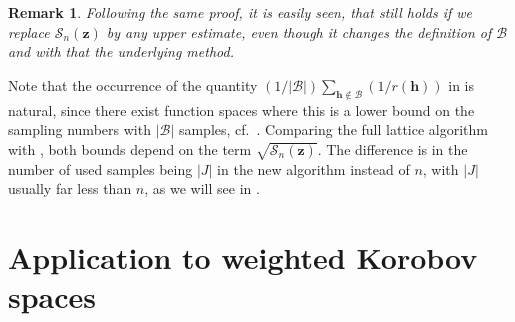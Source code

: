 \documentclass[a4paper]{amsart}
\newtheorem{remark}[theorem]{Remark}
\begin{document}
\begin{remark}\label{workstoo} Following the same proof, it is easily seen, that  still holds if we replace $\mathcal S_n(\bm z)$ by any upper estimate, even though it changes the definition of $\mathcal B$ and with that the underlying method.
\end{remark} 

Note that the occurrence of the quantity $(1/|\mathcal B|) \sum_{\bm h\notin\mathcal B} (1/r(\bm h))$ in  is natural, since there exist function spaces where this is a lower bound on the sampling numbers with $|\mathcal B|$ samples, cf.~\cite[Theorem~2]{HKNV22}.
Comparing the full lattice algorithm  with , both bounds depend on the term $\sqrt{\mathcal S_n(\bm z)}$.
The difference is in the number of used samples being $|J|$ in the new algorithm instead of $n$, with $|J|$ usually far less than $n$, as we will see in .
 \section{Application to weighted Korobov spaces}\label{sec:korobov} 
\end{document}
